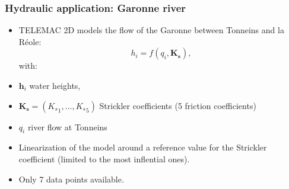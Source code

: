 \documentclass[nopagenumber,9pt]{beamer}
\newcommand{\mb}[1]{\mathbf{#1}}
\begin{document}
\begin{frame}
\frametitle{Hydraulic application: Garonne river}
\begin{itemize}
\item TELEMAC 2D models the flow of the Garonne between Tonneins and la R\'eole:
$$
h_i = f( q_i ,\mb {K_s}),
$$
with:
\end{itemize}
\begin{minipage}{0.4\textwidth}
\begin{itemize}
\item $\mb h_i$ water heights,
\item $\mb {K_s} = ({K_s}_1,\ldots,{K_s}_5)$  Strickler coefficients (5 friction coefficients)
\item $q_i$ river flow at Tonneins
\item Linearization of the model around a reference value for the Strickler coefficient (limited to the most inflential ones).
\item Only 7 data points available.
\end{itemize}
\end{minipage}\hfill
\begin{minipage}{0.5\textwidth}
\end{minipage}

\end{frame}
\end{document}
